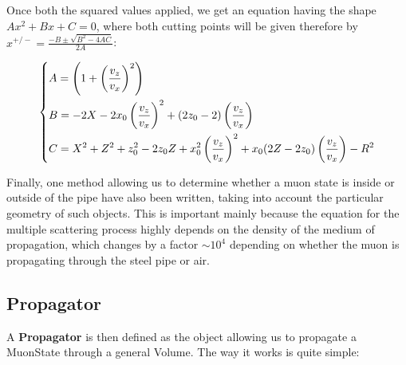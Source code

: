 \documentclass[a4paper, 11pt]{report}
\begin{document}
Once both the squared values applied, we get an equation having the shape $Ax^2 + Bx + C = 0$, where both cutting points will be given therefore by $x^{+/-} = \frac{-B \pm \sqrt{B^2 - 4 AC}}{2A}$:

\begin{equation}
\label{eq:lines}
\begin{dcases}
A = \left (1 + \left (\frac{v_z}{v_x} \right )^2 \right ) \\
B = -2X - 2 x_0 \left (\frac{v_z}{v_x} \right )^2 + (2 z_0 - 2) \left (\frac{v_z}{v_x} \right ) \\
C = X^2 + Z^2 + z_0^2 - 2 z_0 Z + x_0^2 \left (\frac{v_z}{v_x} \right )^2 + x_0 (2 Z - 2 z_0) \left (\frac{v_z}{v_x} \right ) - R^2
\end{dcases}
\end{equation}

Finally, one method allowing us to determine whether a muon state is inside or outside of the pipe have also been written, taking into account the particular geometry of such objects. This is important mainly because the equation for the multiple scattering process highly depends on the density of the medium of propagation, which changes by a factor $\sim10^4$ depending on whether the muon is propagating through the steel pipe or air.

\subsection{Propagator}

A \textbf{Propagator} is then defined as the object allowing us to propagate a MuonState through a general Volume. The way it works is quite simple: 
\end{document}

